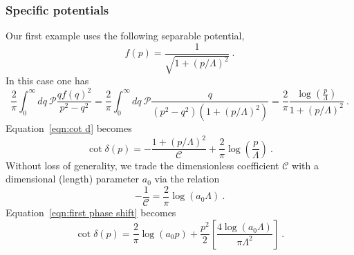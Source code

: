 \subsubsection{Specific potentials}
Our first example uses the following separable potential,
\begin{equation}\label{eqn:potential1}
f(p)=\frac{1}{\sqrt{1+(p/\Lambda)^2}}\ .
\end{equation}
In this case one has
\begin{equation}
\frac{2}{\pi}\int_0^\infty dq \ \mathcal{P}\frac{qf(q)^2}{p^2-q^2}=\frac{2}{\pi}\int_0^\infty dq \ \mathcal{P}\frac{q}{(p^2-q^2)(1+(p/\Lambda)^2)}=\frac{2}{\pi}\frac{\log\left(\frac{p}{\Lambda}\right)}{1+(p/\Lambda)^2}\ .
\end{equation}
Equation~\eqref{eqn:cot d} becomes
\begin{equation}\label{eqn:first phase shift}
\cot\delta(p)=-\frac{1+(p/\Lambda)^2}{\mathcal{C}}+\frac{2}{\pi}\log\left(\frac{p}{\Lambda}\right)\ .
\end{equation}
Without loss of generality, we trade the dimensionless coefficient $\mathcal{C}$ with a dimensional (length) parameter $a_0$ via the relation
\begin{equation}
-\frac{1}{\mathcal{C}}=\frac{2}{\pi}\log(a_0\Lambda)\ .
\end{equation} 
Equation~\eqref{eqn:first phase shift} becomes
\begin{equation}
\cot\delta(p)=\frac{2}{\pi}\log(a_0p)+\frac{p^2}{2}\left[\frac{4\log(a_0\Lambda)}{\pi\Lambda^2}\right]\ .
\end{equation}

